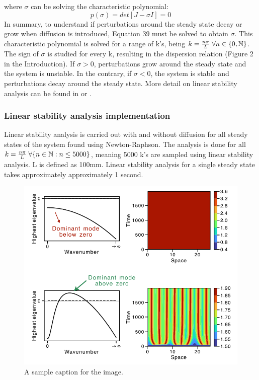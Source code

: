where $\sigma$ can be solving the characteristic polynomial:
\begin{equation}
    p(\sigma) = det[J-\sigma I] = 0
\end{equation}
In summary, to understand if perturbations around the steady state decay or grow when diffusion is introduced, Equation 39 must be solved to obtain $\sigma$. This characteristic polynomial is solved for a range of k's, being $k=\frac{n\pi}{L} \hspace{0.1cm}\forall n \in \{0, \mathbb{N}\} $. The sign of $\sigma$ is studied for every k, resulting in the dispersion relation (Figure 2 in the Introduction). If $\sigma > 0$, perturbations grow around the steady state and the system is unstable. In the contrary, if  $\sigma < 0$, the system is stable and perturbations decay around the steady state. More detail on linear stability analysis can be found in \cite{J.DMurray2002} or \cite{Glendinning1994}.
\subsubsection{Linear stability analysis implementation}
Linear stability analysis is carried out with and without diffusion for all steady states of the system found using Newton-Raphson. The analysis is done for all $k=\frac{n\pi}{L} \hspace{0.1cm}\forall \{n \in \mathbb{N} : n \leq 5000\} $, meaning 5000 k's are sampled using linear stability analysis. L is defined as 100mm.  Linear stability analysis for a single steady state takes approximately approximately 1 second.

\begin{figure}[H] %
    \centering
    \includegraphics[width=1\textwidth]{chapters/Chapter 1/turing_vs_noturing} %
    \caption{A sample caption for the image.}
    \label{fig:turing_vs_noturing} %
\end{figure}


